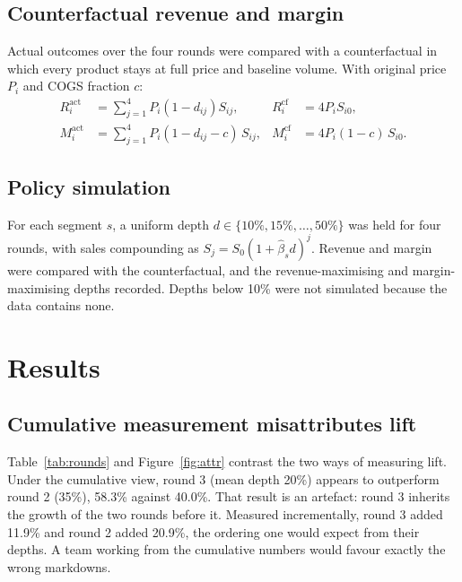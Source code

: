 \documentclass[11pt, a4paper]{article}
\begin{document}
\subsection{Counterfactual revenue and margin}
Actual outcomes over the four rounds were compared with a counterfactual in which every product stays at full price and baseline volume. With original price $P_i$ and COGS fraction $c$:
\begin{align}
R^{\text{act}}_i &= \textstyle\sum_{j=1}^{4} P_i (1-d_{ij}) S_{ij}, & R^{\text{cf}}_i &= 4 P_i S_{i0}, \\
M^{\text{act}}_i &= \textstyle\sum_{j=1}^{4} P_i (1-d_{ij}-c)\, S_{ij}, & M^{\text{cf}}_i &= 4 P_i (1-c)\, S_{i0}.
\end{align}

\subsection{Policy simulation}
For each segment $s$, a uniform depth $d \in \{10\%, 15\%, \dots, 50\%\}$ was held for four rounds, with sales compounding as $S_j = S_0 (1 + \hat\beta_s d)^j$. Revenue and margin were compared with the counterfactual, and the revenue-maximising and margin-maximising depths recorded. Depths below 10\% were not simulated because the data contains none.

\section{Results}
\subsection{Cumulative measurement misattributes lift}
Table~\ref{tab:rounds} and Figure~\ref{fig:attr} contrast the two ways of measuring lift. Under the cumulative view, round 3 (mean depth 20\%) appears to outperform round 2 (35\%), 58.3\% against 40.0\%. That result is an artefact: round 3 inherits the growth of the two rounds before it. Measured incrementally, round 3 added 11.9\% and round 2 added 20.9\%, the ordering one would expect from their depths. A team working from the cumulative numbers would favour exactly the wrong markdowns.
\end{document}
